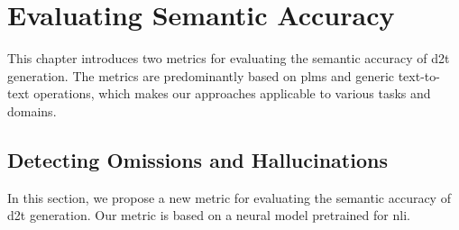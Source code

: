 \documentclass[12pt,notitlepage,a4paper,oneside,openany]{report}
\renewcommand\cite{\citep}
\begin{document}


\chapter{Evaluating Semantic Accuracy}
\label{chap:evaluation}
This chapter introduces two metrics for evaluating the semantic accuracy of \ac{d2t} generation. The metrics are predominantly based on \acp{plm} and generic text-to-text operations, which makes our approaches applicable to various tasks and domains.


\section{Detecting Omissions and Hallucinations}
\label{sec:sem-acc}

In this section, we propose a new metric for evaluating the semantic accuracy of \ac{d2t} generation. Our metric is based on a neural model pretrained for \ac{nli}.
\end{document}
